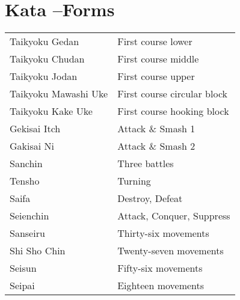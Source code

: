 \documentclass[11pt]{article}
\begin{document}
\section{Kata  --Forms}
\label{sec:org8140f14}
\begin{center}
\begin{tabular}{ll}
Taikyoku Gedan & First course lower\\
Taikyoku Chudan & First course middle\\
Taikyoku Jodan & First course upper\\
Taikyoku Mawashi Uke & First course circular block\\
Taikyoku Kake Uke & First course hooking block\\
Gekisai Itch & Attack \& Smash 1\\
Gakisai Ni & Attack \& Smash 2\\
Sanchin & Three battles\\
Tensho & Turning\\
Saifa & Destroy, Defeat\\
Seienchin & Attack, Conquer, Suppress\\
Sanseiru & Thirty-six movements\\
Shi Sho Chin & Twenty-seven movements\\
Seisun & Fifty-six movements\\
Seipai & Eighteen movements\\
\end{tabular}
\end{center}
\end{document}
